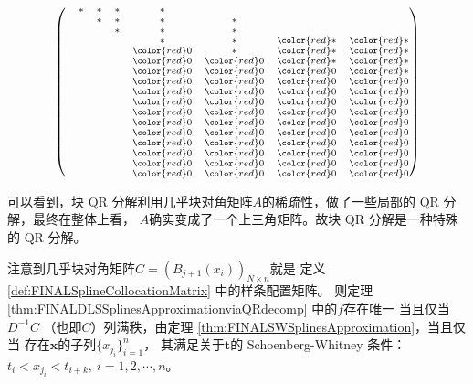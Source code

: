 \begin{exm}
\begin{eqnarray}
\begin{scriptsize}
\begin{aligned}
\begin{pmatrix}
              & \ast& \ast& \ast& \ast  &  &  &\\
              & & \ast& \ast& \ast& \ast &  &\\
              & & & \ast& \ast  & \ast &  &\\
              & & & & \ast  & \ast & {\color{red} \ast}  &{\color{red} \ast}\\
          & & & & {\color{red} 0}& \ast & {\color{red} \ast} & {\color{red} \ast}\\
          & & & & {\color{red} 0}& {\color{red} 0} & {\color{red} \ast} & {\color{red} \ast}\\
          & & & & {\color{red} 0}& {\color{red} 0} & {\color{red} 0} & {\color{red} \ast}\\
          &  && & {\color{red} 0}& {\color{red} 0}&  {\color{red} 0}& {\color{red} 0}\\
          &  & && {\color{red} 0}& {\color{red} 0}&  {\color{red} 0}& {\color{red} 0}\\
          &  & && {\color{red} 0}& {\color{red} 0}&  {\color{red} 0}& {\color{red} 0}\\
          &  & && {\color{red} 0}& {\color{red} 0}&  {\color{red} 0}& {\color{red} 0}\\
          &  & && {\color{red} 0}& {\color{red} 0}&  {\color{red} 0}& {\color{red} 0}\\
          &  & && {\color{red} 0}& {\color{red} 0}&  {\color{red} 0}& {\color{red} 0}\\
          &  &  &  & {\color{red} 0}& {\color{red} 0}&  {\color{red} 0}& {\color{red} 0}\\
          &  &  &  & {\color{red} 0}& {\color{red} 0}&  {\color{red} 0}& {\color{red} 0}\\
          &  &  &  & {\color{red} 0}& {\color{red} 0}&  {\color{red} 0}& {\color{red} 0}\\
          &  &  &  & {\color{red} 0}& {\color{red} 0}&  {\color{red} 0}& {\color{red} 0}
        \end{pmatrix}
      \end{aligned}
    \end{scriptsize}
  \end{eqnarray}
\end{exm}

可以看到，块 QR 分解利用几乎块对角矩阵$A$的稀疏性，做了一些局部的 QR 分解，最终在整体上看，
$A$确实变成了一个上三角矩阵。故块 QR 分解是一种特殊的 QR 分解。


注意到几乎块对角矩阵$C=(B_{j+1}(x_{i}))_{N\times n}$就是
定义 \ref{def:FINALSplineCollocationMatrix} 中的样条配置矩阵。
则定理 \ref{thm:FINALDLSSplinesApproximationviaQRdecomp} 中的$f$存在唯一
当且仅当 $D^{-1}C$ （也即$C$）列满秩，由定理
\ref{thm:FINALSWSplinesApproximation}，当且仅当
存在$\mathbf{x}$的子列$\{x_{j_{i}}\}_{i=1}^{n}$，
    其满足关于$\mathbf{t}$的 Schoenberg-Whitney 条件：
    $t_{i}<x_{j_{i}}<t_{i+k},\ i=1,2,\cdots,n$。
    
